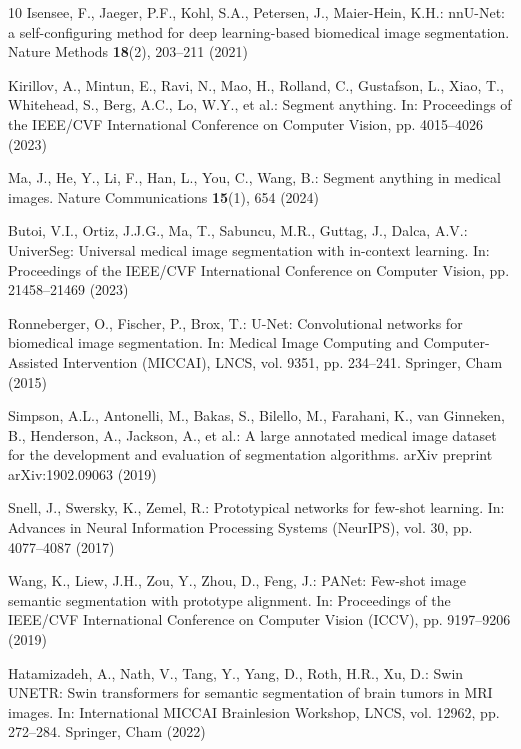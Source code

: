 \documentclass[runningheads]{llncs}
\begin{document}
%
%
\begin{thebibliography}{10}
Isensee, F., Jaeger, P.F., Kohl, S.A., Petersen, J., Maier-Hein, K.H.: nnU-Net: a self-configuring method for deep learning-based biomedical image segmentation. Nature Methods \textbf{18}(2), 203--211 (2021)

Kirillov, A., Mintun, E., Ravi, N., Mao, H., Rolland, C., Gustafson, L., Xiao, T., Whitehead, S., Berg, A.C., Lo, W.Y., et al.: Segment anything. In: Proceedings of the IEEE/CVF International Conference on Computer Vision, pp. 4015--4026 (2023)

Ma, J., He, Y., Li, F., Han, L., You, C., Wang, B.: Segment anything in medical images. Nature Communications \textbf{15}(1), 654 (2024)

Butoi, V.I., Ortiz, J.J.G., Ma, T., Sabuncu, M.R., Guttag, J., Dalca, A.V.: UniverSeg: Universal medical image segmentation with in-context learning. In: Proceedings of the IEEE/CVF International Conference on Computer Vision, pp. 21458--21469 (2023)

Ronneberger, O., Fischer, P., Brox, T.: U-Net: Convolutional networks for biomedical image segmentation. In: Medical Image Computing and Computer-Assisted Intervention (MICCAI), LNCS, vol. 9351, pp. 234--241. Springer, Cham (2015)

Simpson, A.L., Antonelli, M., Bakas, S., Bilello, M., Farahani, K., van Ginneken, B., Henderson, A., Jackson, A., et al.: A large annotated medical image dataset for the development and evaluation of segmentation algorithms. arXiv preprint arXiv:1902.09063 (2019)

Snell, J., Swersky, K., Zemel, R.: Prototypical networks for few-shot learning. In: Advances in Neural Information Processing Systems (NeurIPS), vol. 30, pp. 4077--4087 (2017)

Wang, K., Liew, J.H., Zou, Y., Zhou, D., Feng, J.: PANet: Few-shot image semantic segmentation with prototype alignment. In: Proceedings of the IEEE/CVF International Conference on Computer Vision (ICCV), pp. 9197--9206 (2019)

Hatamizadeh, A., Nath, V., Tang, Y., Yang, D., Roth, H.R., Xu, D.: Swin UNETR: Swin transformers for semantic segmentation of brain tumors in MRI images. In: International MICCAI Brainlesion Workshop, LNCS, vol. 12962, pp. 272--284. Springer, Cham (2022)


\end{thebibliography}
\end{document}
